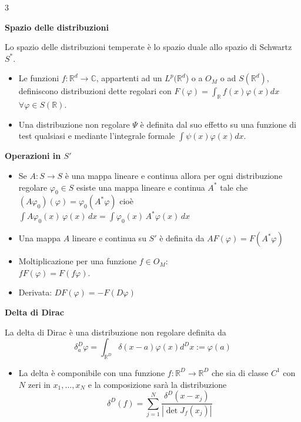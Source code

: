 \documentclass[10pt,a4paper]{report}
\begin{document}
\begin{multicols*}{3}
\begin{center}
\begin{itemize}[label=$\cdot$]
	\end{itemize}
\textbf{Spazio delle distribuzioni} \par
Lo spazio delle distribuzioni temperate è lo spazio duale allo spazio di Schwartz $S^*$.
	\begin{itemize}[label=$\cdot$]
		\item Le funzioni $f:\mathbb{R}^d\rightarrow\mathbb{C}$, appartenti ad un $L^p(\mathbb{R}^d$) o a $O_M$ o ad $S(\mathbb{R}^d)$, definiscono distribuzioni dette regolari con $F(\varphi)=\int_\mathbb{R} f(x)\varphi(x) dx$ $\forall\varphi\in S(\mathbb{R})$.
		\item Una distribuzione non regolare $\Psi$ è definita dal suo effetto su una funzione di test qualsiasi e mediante l'integrale formale $\int \psi(x) \varphi(x) dx$.
	\end{itemize}
\par
	\textbf{\boldmath Operazioni in $S'$ \unboldmath} \par
		\begin{itemize}[label=$\cdot$]
			\item 	Se $A:S\rightarrow S$ è una mappa lineare e continua allora per ogni distribuzione regolare $\varphi_0\in S$ esiste una mappa lineare e continua $A^*$ tale che $(A\varphi_0)(\varphi)=\varphi_0(A^*\varphi)$ cioè
			$\int A\varphi_0 (x) \, \varphi(x)\, dx = \int \varphi_0(x) \, A^*\varphi(x)\, dx$
			\item Una mappa $A$ lineare e continua su $S'$ è definita da $AF(\varphi)=F(A^*\varphi)$
			\item Moltiplicazione per una funzione $f\in O_M$:\\$fF(\varphi)=F(f\varphi)$.
			\item Derivata: $DF(\varphi)=-F(D\varphi)$
		\end{itemize}
\par
	\textbf{ Delta di Dirac} \par
	La delta di Dirac è una distribuzione non regolare definita da
	\[
	\delta^D_a \varphi= \int_{\mathbb{R}^D} \delta(x-a) \varphi(x) d^Dx := \varphi(a)
	\]		
	\begin{itemize}[label=$\cdot$]
		\item La delta è componibile con una funzione $f:\mathbb{R}^D\rightarrow\mathbb{R}^D$ che sia di classe $C^1$ con $N$ zeri in $x_1,\dots,x_N$ e la composizione sarà la distribuzione
		\[
			\delta^D(f)=\sum_{j=1}^N \dfrac{\delta^D(x-x_j)}{|\det{J_f}(x_j)|} 
		\]
	\end{itemize}
\par

\end{center}
\end{multicols*}
\end{document}

